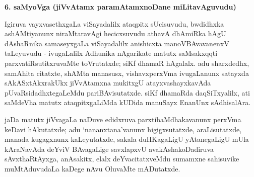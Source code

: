 \smallskip
\begin{center}
{\Large\bf 6. saMyoVga (jiVvAtamx paramAtamxnoDane miLitavAguvudu)}
\end{center}

Igiruva vayxvasethxgaLa viSayadalilx ataqpitx sUcisuvudu, bwdidhxka ashAMtiyanunx niraMtaravAgi hecicxsuvudu athavA dhAmiRka hAgU dAshaRnika samaseyxgaLa viSayadalilx anishicxta manoVBAvavanenxV taLeyuvudu - ivugaLalilx Adhunika nAgarikate matutx saMsakxqqti parxvatiRsutitxruvaMte toVrutatxde; siKf dhamaR hAgalalx. adu sharxdedhx, samAhita citatxte, shAMta manasusx, vishavxperxVma ivugaLanunx satayxda sAkASxtAkxrakUkx jiVvAtamxna mukitxgU atayxvashayxkavAda pUvaRsidadhxtegaLeMdu pariBAvisutatxde. siKf dhamaRda daqSiTxyalilx, ati saMdeVha matutx ataqpitxgaLiMda kUDida manuSayx EnanUnx sAdhisalAra.

jaDa matutx jiVvagaLa naDuve edidxruva parxtibaMdhakavanunx perxVma keDavi hAkutatxde; adu `nananxtana'vanunx higigxsutatxde, araLisutatxde, manada kugagxnunx kaLeyutatxde, sakala duHKagaLigU yAtanegaLigU mUla kAraNavAda deYviV BAvagaLige savxlapxvU avakAshakoDadiruva sAvxthaRtAyxga, anAsakitx, elalx deYvacitatxveMdu sumamxne sahisuvike muMtAduvudaLa kaDege nAvu OluvaMte mADutatxde.

